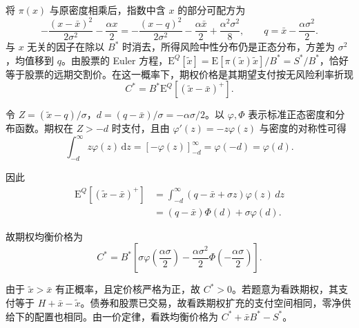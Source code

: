 \begin{solution}[blank-type=manual,blank-vsep=12\baselineskip]
\begin{enumerate}[label=(\alph*)]
将 $\pi(x)$ 与原密度相乘后，指数中含 $x$ 的部分可配方为
\[
 -\frac{(x-\bar x)^2}{2\sigma^2}-\frac{\alpha x}{2}
 =-\frac{(x-q)^2}{2\sigma^2}
   -\frac{\alpha\bar x}{2}+\frac{\alpha^2\sigma^2}{8},
 \qquad q=\bar x-\frac{\alpha\sigma^2}{2}.
\]
与 $x$ 无关的因子在除以 $B^*$ 时消去，所得风险中性分布仍是正态分布，方差为 $\sigma^2$，均值移到 $q$。由股票的 Euler 方程，$\mathrm E^Q[\widetilde x]=\mathrm E[\pi(\widetilde x)\widetilde x]/B^*=S^*/B^*$，恰好等于股票的远期交割价。在这一概率下，期权价格是其期望支付按无风险利率折现
\[
 C^*=B^*\mathrm E^Q[(\widetilde x-\bar x)^+].
\]

令 $Z=(\widetilde x-q)/\sigma$，$d=(q-\bar x)/\sigma=-\alpha\sigma/2$。以 $\varphi,\Phi$ 表示标准正态密度和分布函数。期权在 $Z>-d$ 时支付，且由 $\varphi'(z)=-z\varphi(z)$ 与密度的对称性可得
\[
 \int_{-d}^{\infty} z\varphi(z)\,\mathrm dz
 =[-\varphi(z)]_{-d}^{\infty}=\varphi(-d)=\varphi(d).
\]

因此
\[
 \begin{aligned}
 \mathrm E^Q[(\widetilde x-\bar x)^+]
 &=\int_{-d}^{\infty}(q-\bar x+\sigma z)\varphi(z)\,dz\\
 &=(q-\bar x)\Phi(d)+\sigma\varphi(d).
 \end{aligned}
\]

故期权均衡价格为
\[
 \boxed{C^*=B^*\left[\sigma\varphi\left(\frac{\alpha\sigma}{2}\right)
 -\frac{\alpha\sigma^2}{2}\Phi\left(-\frac{\alpha\sigma}{2}\right)\right]}.
\]

由于 $\widetilde x>\bar x$ 有正概率，且定价核严格为正，故 $C^*>0$。若题意为看跌期权，其支付等于 $H+\bar x-\widetilde x$。债券和股票已交易，故看跌期权扩充的支付空间相同，零净供给下的配置也相同。由一价定律，看跌均衡价格为 $C^*+\bar x B^*-S^*$。\qedhere
\end{enumerate}
\end{solution}

